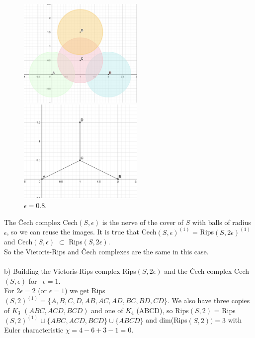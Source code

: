 \documentclass[a4paper,11pt]{article}
\begin{document}
\begin{figure}[ht!]
    \begin{minipage}{0.5\textwidth}
        \centering
        \includegraphics[width=60mm]{r08.png}
        \caption{$\epsilon = 0.8$.}
    \end{minipage}\hfill
    \begin{minipage}{0.5\textwidth}
        \centering
        \includegraphics[width=60mm]{08povezave.png}
        \caption{$\epsilon = 0.8$.}
    \end{minipage}\hfill
\end{figure}
\noindent
The Čech complex Cech$(S, \epsilon)$ is the nerve of the cover of $S$ with balls of radius $\epsilon$, so we can reuse the images.
It is true that Cech$(S, \epsilon)^{(1)}$ = Rips$(S, 2 \epsilon)^{(1)}$ and Cech$(S, \epsilon)$ $\subset$ Rips$(S, 2 \epsilon)$.
\\
So the Vietoris-Rips and Čech complexes are the same in this case.
\\
\\


\noindent
b) Building the Vietoris-Rips complex Rips$(S, 2\epsilon)$ and the Čech complex Cech$(S, \epsilon)$ for $ \ \epsilon = 1$.
\\
For $2 \epsilon = 2$ (or $\epsilon = 1$) we get Rips$(S, 2)^{(1)} = \{A, B, C, D, AB, AC, AD, BC, BD, CD\}$. We also have three copies of $K_3$ $(ABC, ACD, BCD)$ and one of $K_4$ (ABCD), so 
Rips$(S, 2)$ = Rips$(S, 2)^{(1)}$ $\cup \ \{ ABC, ACD, BCD\} \cup \{ ABCD\}$ and dim(Rips$(S, 2)) = 3$ with Euler characteristic $\chi = 4 - 6 + 3 -1 = 0$.
\end{document}

